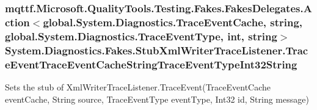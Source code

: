 \hypertarget{class_system_1_1_diagnostics_1_1_fakes_1_1_stub_xml_writer_trace_listener_a4cbdd48120aca9cf6400bb9d9cd93ec9}{
\subsubsection[{Trace\-Event\-Trace\-Event\-Cache\-String\-Trace\-Event\-Type\-Int32\-String}]{\setlength{\rightskip}{0pt plus 5cm}mqttf.\-Microsoft.\-Quality\-Tools.\-Testing.\-Fakes.\-Fakes\-Delegates.\-Action$<$global.\-System.\-Diagnostics.\-Trace\-Event\-Cache, string, global.\-System.\-Diagnostics.\-Trace\-Event\-Type, int, string$>$ System.\-Diagnostics.\-Fakes.\-Stub\-Xml\-Writer\-Trace\-Listener.\-Trace\-Event\-Trace\-Event\-Cache\-String\-Trace\-Event\-Type\-Int32\-String}}\label{class_system_1_1_diagnostics_1_1_fakes_1_1_stub_xml_writer_trace_listener_a4cbdd48120aca9cf6400bb9d9cd93ec9}


Sets the stub of Xml\-Writer\-Trace\-Listener.\-Trace\-Event(\-Trace\-Event\-Cache event\-Cache, String source, Trace\-Event\-Type event\-Type, Int32 id, String message)

